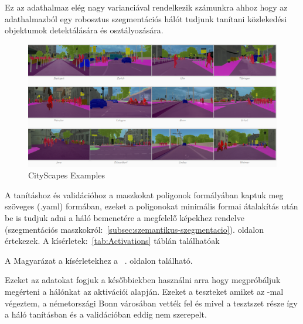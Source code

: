 \documentclass[12pt,oneside,a4paper]{article}
\theoremstyle{remark}
\begin{document}
    Ez az adathalmaz elég nagy
    varianciával rendelkezik számunkra ahhoz hogy az adathalmazból egy robosztus szegmentációs hálót tudjunk tanítani közlekedési objektumok detektálására és osztályozására.


    \begin{figure}[ht]
       \centering
        \noindent\includegraphics[width=1\linewidth]{cityscapes}
        \caption{CityScapes Examples}
        \label{fig:CityScapes-Examples}
    \end{figure}
    A tanításhoz és validációhoz a maszkokat poligonok formályában kaptuk meg szöveges (.yaml) formában, ezeket a poligonokat
    minimális formai átalakítás után be is tudjuk adni a háló bemenetére a megfelelő képekhez rendelve (szegmentációs
    maszkokról:~\ref{subsec:szemantikus-szegmentacio}). oldalon értekezek.
    A kísérletek:~\ref{tab:Activations} táblán találhatóak

    A Magyarázat a kísérletekhez a ~\pageref{subsec:magyarazat}\label{pageref}.
    oldalon található.

    Ezeket az adatokat fogjuk a későbbiekben használni arra hogy megpróbáljuk megérteni a hálónkat az aktivációi
    alapján.
    Ezeket a teszteket amiket az -mal végeztem, a németországi Bonn városában vették fel és mivel a tesztszet része így a háló tanításban és a validációban eddig nem szerepelt.
\end{document}
